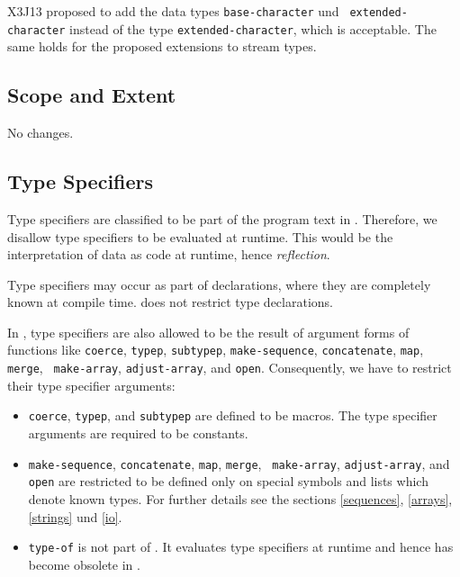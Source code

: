X3J13 proposed to add the data types {\tt base-character} und {\tt
  extended-character} instead of the type {\tt extended-character},
which is acceptable. The same holds for the proposed extensions to
stream types.

\subsection{Scope and Extent}

No changes.

\subsection{Type Specifiers}
\label{type}

Type specifiers are classified to be part of the program text in . 
Therefore, we disallow type specifiers to be evaluated at runtime.
This would be the interpretation of data as code at runtime, hence {\em 
reflection}.

Type specifiers may occur as part of declarations, where they are 
completely known at compile time.  does not restrict type declarations.

In \CL, type specifiers are also allowed to be the result of argument
forms of functions like {\tt coerce}, {\tt typep}, {\tt subtypep},
{\tt make-sequence}, {\tt concatenate}, {\tt map}, {\tt merge}, {\tt
make-array}, {\tt adjust-array}, and {\tt open}. Consequently, we have
to restrict their type specifier arguments:


\begin{itemize}
\item {\tt coerce}, {\tt typep}, and {\tt subtypep} are defined to be 
macros. The type specifier arguments are required to be constants.
\item {\tt make-sequence}, {\tt concatenate}, {\tt map}, {\tt merge}, {\tt 
make-array}, {\tt adjust-array}, and {\tt open} are restricted to be 
defined only on special symbols and lists which denote known types. For 
further details see the sections \ref{sequences}, \ref{arrays}, 
\ref{strings} und \ref{io}.
\item {\tt type-of} is not part of . It evaluates type specifiers at 
runtime and hence has become obsolete in .
\end{itemize}

